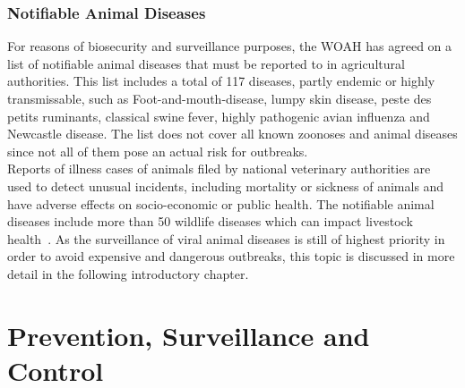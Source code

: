 \subsubsection*{Notifiable Animal Diseases}
For reasons of biosecurity and surveillance purposes, the \ac{WOAH} has agreed on a list of notifiable animal diseases that must be reported to in agricultural authorities. This list includes a total of 117 diseases, partly endemic or highly transmissable, such as Foot-and-mouth-disease, lumpy skin disease, peste des petits ruminants, classical swine fever, highly pathogenic avian influenza and Newcastle disease. The list does not cover all known zoonoses and animal diseases since not all of them pose an actual risk for outbreaks. \\
Reports of illness cases of animals filed by national veterinary authorities are used to detect unusual incidents, including mortality or sickness of animals and have adverse effects on socio-economic or public health. The notifiable animal diseases include more than 50 wildlife diseases which can impact livestock health~\cite{woah2023list}. As the surveillance of viral animal diseases is still of highest priority in order to avoid expensive and dangerous outbreaks, this topic is discussed in more detail in the following introductory chapter.

\section{Prevention, Surveillance and Control}

